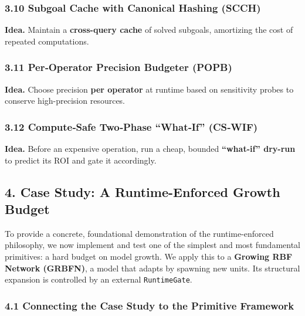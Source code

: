 \documentclass[
]{article}
\begin{document}
\hypertarget{subgoal-cache-with-canonical-hashing-scch}{%
\subsubsection{3.10 Subgoal Cache with Canonical Hashing
(SCCH)}\label{subgoal-cache-with-canonical-hashing-scch}}

\textbf{Idea.} Maintain a \textbf{cross-query cache} of solved subgoals,
amortizing the cost of repeated computations.

\hypertarget{peroperator-precision-budgeter-popb}{%
\subsubsection{3.11 Per‑Operator Precision Budgeter
(POPB)}\label{peroperator-precision-budgeter-popb}}

\textbf{Idea.} Choose precision \textbf{per operator} at runtime based
on sensitivity probes to conserve high-precision resources.

\hypertarget{computesafe-twophase-whatif-cswif}{%
\subsubsection{3.12 Compute‑Safe Two‑Phase ``What‑If''
(CS‑WIF)}\label{computesafe-twophase-whatif-cswif}}

\textbf{Idea.} Before an expensive operation, run a cheap, bounded
\textbf{``what-if'' dry-run} to predict its ROI and gate it accordingly.

\hypertarget{case-study-a-runtime-enforced-growth-budget}{%
\subsection{4. Case Study: A Runtime-Enforced Growth
Budget}\label{case-study-a-runtime-enforced-growth-budget}}

To provide a concrete, foundational demonstration of the
runtime-enforced philosophy, we now implement and test one of the
simplest and most fundamental primitives: a hard budget on model growth.
We apply this to a \textbf{Growing RBF Network (GRBFN)}, a model that
adapts by spawning new units. Its structural expansion is controlled by
an external \texttt{RuntimeGate}.

\hypertarget{connecting-the-case-study-to-the-primitive-framework}{%
\subsubsection{4.1 Connecting the Case Study to the Primitive
Framework}\label{connecting-the-case-study-to-the-primitive-framework}}
\end{document}
